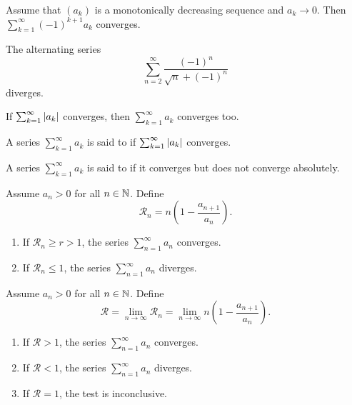 \begin{proposition}
  Assume that $(a_k)$ is a monotonically decreasing sequence and $a_k
  \to 0$. Then $\sum_{k = 1}^{\infty} (-1)^{k + 1} a_k$ converges.
\end{proposition}

\begin{example}
  The alternating series
  \[ \sum_{n = 2}^{\infty} \frac{(-1)^n}{\sqrt{n} + (-1)^n} \]
  diverges.
\end{example}

\begin{proposition}
  If $\sum_{k = 1}^{\infty} | a_k |$ converges, then $\sum_{k =
  1}^{\infty} a_k$ converges too.
\end{proposition}

\begin{definition}
  A series $\sum_{k = 1}^{\infty} a_k$ is said to  if $\sum_{k = 1}^{\infty} | a_k |$ converges.
\end{definition}

\begin{definition}
  A series $\sum_{k = 1}^{\infty} a_k$ is said to  if it converges but does not converge absolutely.
\end{definition}

\begin{proposition}
  Assume $a_n > 0$ for all $n \in \mathbb N$. Define
  \[ \mathcal{R}_n = n \left(1 - \frac{a_{n + 1}}{a_n}\right). \]
  \begin{enumerate}
    \item If $\mathcal{R}_n \geq r > 1$, the series $\sum_{n =
      1}^{\infty} a_n$ converges.
    \item If $\mathcal{R}_n \leq 1$, the series $\sum_{n =
      1}^{\infty} a_n$ diverges.
  \end{enumerate}
\end{proposition}

\begin{proposition}
  Assume $a_n > 0$ for all $n \in \mathbb N$. Define
  \[ \mathcal{R} = \lim_{n \to \infty} \mathcal{R}_n = \lim_{n \to
  \infty} n \left(1 - \frac{a_{n + 1}}{a_n}\right). \]
  \begin{enumerate}
    \item If $\mathcal{R} > 1$, the series $\sum_{n = 1}^{\infty}
      a_n$ converges.
    \item If $\mathcal{R} < 1$, the series $\sum_{n = 1}^{\infty} a_n$ diverges.
    \item If $\mathcal{R} = 1$, the test is inconclusive.
  \end{enumerate}
\end{proposition}

